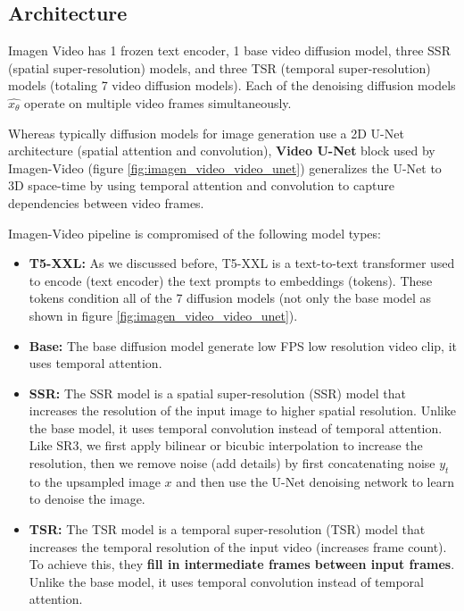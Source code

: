 \subsection{Architecture}

Imagen Video has 1 frozen text encoder, 1 base video diffusion model, three SSR (spatial super-resolution) models, and three TSR (temporal super-resolution) models (totaling 7 video diffusion models). Each of the denoising diffusion models $\hat{x_\theta}$ operate on multiple video frames simultaneously.

Whereas typically diffusion models for image generation use a 2D U-Net architecture (spatial attention and convolution), \textbf{Video U-Net} block used by Imagen-Video (figure \ref{fig:imagen_video_video_unet}) generalizes the U-Net to 3D space-time by using temporal attention and convolution to capture dependencies between video frames.

Imagen-Video pipeline is compromised of the following model types:

\begin{itemize}
    \item \textbf{T5-XXL:} As we discussed before, T5-XXL is a text-to-text transformer used to encode (text encoder) the text prompts to embeddings (tokens). These tokens condition all of the 7 diffusion models (not only the base model as shown in figure \ref{fig:imagen_video_video_unet}).
    \item \textbf{Base:} The base diffusion model generate low FPS low resolution video clip, it uses temporal attention.
    \item \textbf{SSR:} The SSR model is a spatial super-resolution (SSR) model that increases the resolution of the input image to higher spatial resolution. Unlike the base model, it uses temporal convolution instead of temporal attention. Like SR3, we first apply bilinear or bicubic interpolation to increase the resolution, then we remove noise (add details) by first concatenating noise $y_t$ to the upsampled image $x$ and then use the U-Net denoising network to learn to denoise the image.
    \item \textbf{TSR:} The TSR model is a temporal super-resolution (TSR) model that increases the temporal resolution of the input video (increases frame count). To achieve this, they \textbf{fill in intermediate frames between input frames}. Unlike the base model, it uses temporal convolution instead of temporal attention.
\end{itemize}


